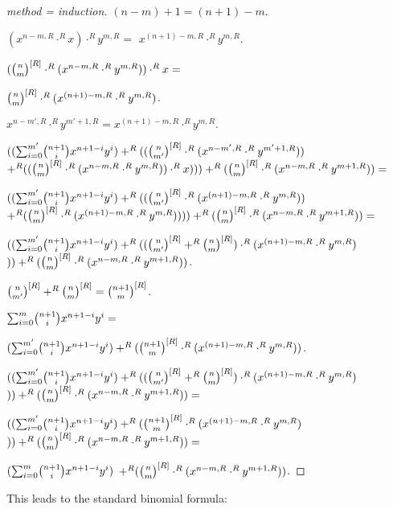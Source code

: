 \documentclass[11pt]{article}
\begin{document}
\begin{forthel}
\begin{proof}[method = induction]
$(n - m) + 1 = (n + 1) - m$.

$(x^{n - m,R} \cdot^{R} x) \cdot^{R} y^{m,R} =$
$x^{(n+1)-m,R} \cdot^{R} y^{m,R}$.

$(\cho{n}{m}^{[R]} \cdot^{R} (x^{n - m,R} \cdot^{R} y^{m,R})) \cdot^{R} x = $

$\cho{n}{m}^{[R]} \cdot^{R} (x^{(n+1) - m,R} \cdot^{R} y^{m,R})$.

$x^{n-m',R} \cdot^{R} y^{m'+1,R} = x^{(n+1)-m,R} \cdot^{R} y^{m,R}.$

$ ((\binsum{m'}{n+1}{x}{y}{R}) +^{R} ((\cho{n}{m'}^{[R]} \cdot^{R} (x^{n-m',R} \cdot^{R} y^{m'+1,R})) $
$ +^{R} 
((\cho{n}{m}^{[R]} \cdot^{R} (x^{n - m,R} \cdot^{R} y^{m,R})) \cdot^{R} x)))
   +^{R} (\cho{n}{m}^{[R]} \cdot^{R} (x^{n - m,R} \cdot^{R} y^{m+1,R})) = $

$ ((\binsum{m'}{n+1}{x}{y}{R}) +^{R} ((\cho{n}{m'}^{[R]} \cdot^{R} (x^{(n+1)-m,R} \cdot^{R} y^{m,R})) $
$ +^{R} 
(\cho{n}{m}^{[R]} \cdot^{R} (x^{(n+1) - m,R} \cdot^{R} y^{m,R}))))
   +^{R} (\cho{n}{m}^{[R]} \cdot^{R} (x^{n - m,R} \cdot^{R} y^{m+1,R})) =$

$ ((\binsum{m'}{n+1}{x}{y}{R}) +^{R} ((\cho{n}{m'}^{[R]} +^{R}  \cho{n}{m}^{[R]} )\cdot^{R} (x^{(n+1)-m,R} \cdot^{R} y^{m,R}) $
$  ))
   +^{R} (\cho{n}{m}^{[R]} \cdot^{R} (x^{n - m,R} \cdot^{R} y^{m+1,R})) $.

$\cho{n}{m'}^{[R]} +^{R}  \cho{n}{m}^{[R]} = \cho{n+1}{m}^{[R]}$.



$ \binsum{m}{n+1}{x}{y}{R} =$

$(\binsum{m'}{n+1}{x}{y}{R}) +^{R} (\cho{n+1}{m}^{[R]} \cdot^{R} (x^{(n+1)-m,R} \cdot^{R} y^{m,R}))$.



$ ((\binsum{m'}{n+1}{x}{y}{R}) +^{R} ((\cho{n}{m'}^{[R]} +^{R}  \cho{n}{m}^{[R]} )\cdot^{R} (x^{(n+1)-m,R} \cdot^{R} y^{m,R}) $
$  ))
   +^{R} (\cho{n}{m}^{[R]} \cdot^{R} (x^{n - m,R} \cdot^{R} y^{m+1,R})) =$


$ ((\binsum{m'}{n+1}{x}{y}{R}) +^{R} (\cho{n+1}{m}^{[R]} \cdot^{R} (x^{(n+1)-m,R} \cdot^{R} y^{m,R}) $
$  ))
   +^{R} (\cho{n}{m}^{[R]} \cdot^{R} (x^{n - m,R} \cdot^{R} y^{m+1,R})) =$

$ (\binsum{m}{n+1}{x}{y}{R}) $
$  +^{R} (\cho{n}{m}^{[R]} \cdot^{R} (x^{n - m,R} \cdot^{R} y^{m+1,R})) $.

\end{proof}
\end{forthel}
%
This leads to the standard binomial formula:
%
\end{document}
